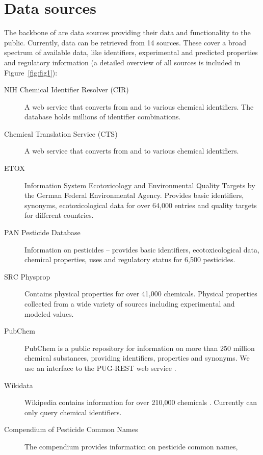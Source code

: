 \documentclass[article]{jss}
\begin{document}
\section[Data sources]{Data sources}\label{sec:data-sources}
The backbone of  are data sources providing their data
and functionality to the public.  Currently, data can be retrieved
from 14 sources.  These cover a broad spectrum of available data, like
identifiers, experimental and predicted properties and regulatory
information (a detailed overview of all sources is included in
Figure~\ref{fig:fig1}):

\begin{description}
\item[NIH Chemical Identifier Resolver (CIR)]{\citep{cir} A web
    service that converts from and to various chemical identifiers. The database holds millions of identifier combinations.}
\item[Chemical Translation Service (CTS)]{
  \citep{Wohlgemuth_Haldiya_Willighagen_Kind_Fiehn_2010} A web
    service that converts from and to various chemical identifiers.}
\item[ETOX]{\citep{etox} Information System Ecotoxicology and
    Environmental Quality Targets by the German Federal Environmental
    Agency. Provides basic identifiers, synonyms, ecotoxicological
    data for over 64,000 entries and quality targets for different countries.}
\item[PAN Pesticide Database]{ \citep{pan} Information on pesticides --
    provides basic identifiers, ecotoxicological data, chemical
    properties, uses and regulatory status for 6,500 pesticides.}
\item[SRC Physprop]{\citep{physprop} Contains physical properties for
    over 41,000 chemicals.  Physical properties collected from a wide
    variety of sources including experimental and modeled values.}
\item[PubChem]{\citep{Kim_2016} PubChem is a public repository for
    information on more than 250 million chemical substances, providing identifiers,
    properties and synonyms. We use an interface to the PUG-REST web
    service \citep{Kim_Thiessen_Bolton_Bryant_2015}.}
\item[Wikidata]{\citep{wiki} Wikipedia contains information for over
    210,000 chemicals
    \citep{Ertl_Patiny_Sander_Rufener_Zasso_2015}. Currently
     can only query chemical identifiers.}
\item[Compendium of Pesticide Common Names]{\citep{wood} The
    compendium provides information on pesticide common names,
}
\end{description}
\end{document}
